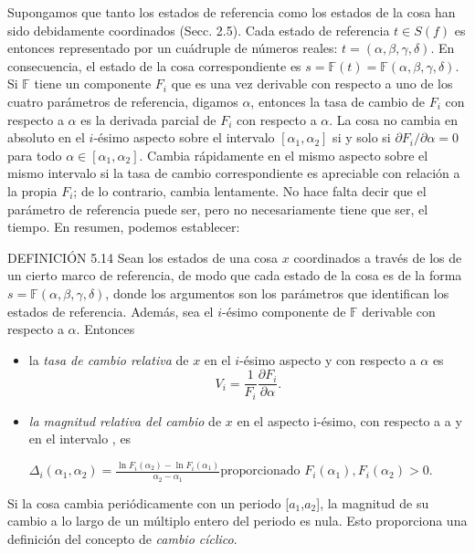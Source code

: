 \begin{justifying}
    Supongamos que tanto los estados de referencia como los estados de la cosa han sido debidamente coordinados (Secc. 2.5). Cada 
    estado de referencia $t \in S(f)$ es entonces representado por un cuádruple de números reales: $t = (\alpha, \beta, \gamma, \delta)$. 
    En consecuencia, el estado de la cosa correspondiente es $s = \mathbb{F}(t) = \mathbb{F}(\alpha, \beta, \gamma, \delta)$. Si $\mathbb{F}$ 
    tiene un componente $F_i$ que es una vez derivable con respecto a uno de los cuatro parámetros de referencia, digamos $\alpha$, entonces 
    la tasa de cambio de $F_i$ con respecto a $\alpha$ es la derivada parcial de $F_i$ con respecto a $\alpha$. La cosa no cambia en absoluto 
    en el $i$-ésimo aspecto sobre el intervalo $[\alpha_1, \alpha_2]$ si y solo si $\partial F_i/\partial \alpha = 0$ para todo $\alpha \in [\alpha_1, \alpha_2]$. 
    Cambia rápidamente en el mismo aspecto sobre el mismo intervalo si la tasa de cambio correspondiente es apreciable con relación a la 
    propia $F_i$; de lo contrario, cambia lentamente. No hace falta decir que el parámetro de referencia puede ser, pero no necesariamente 
    tiene que ser, el tiempo. En resumen, podemos establecer:

    DEFINICIÓN 5.14 Sean los estados de una cosa $x$ coordinados a través de los de un cierto marco de referencia, de modo que cada estado de la cosa es de la forma $s=\mathbb{F}(\alpha, \beta, \gamma, \delta)$, donde los argumentos son los parámetros que identifican los estados de referencia. Además, sea el $i$-ésimo componente de $\mathbb{F}$ derivable con respecto a $\alpha$. Entonces
    \begin{itemize}
        \item[(i)] la \textit{tasa de cambio relativa} de $x$ en el $i$-ésimo aspecto y con respecto a $\alpha$ es
            \[
                V_i = \frac{1}{F_i} \frac{\partial F_i}{\partial \alpha}.
            \]    
        \item[(ii)] \textit{la magnitud relativa del cambio} de $x$ en el aspecto i-ésimo, con respecto a a y en el intervalo , es
        \begin{center}
            $
                \Delta_i(\alpha_1, \alpha_2) = \frac{\ln F_i(\alpha_2) - \ln F_i(\alpha_1)}{\alpha_2 - \alpha_1}
                \text{proporcionado } F_i(\alpha_1), F_i(\alpha_2) > 0.
            $
        \end{center} 
    \end{itemize}

    Si la cosa cambia periódicamente con un periodo [$a_1$,$a_2$], la magnitud de su
    cambio a lo largo de un múltiplo entero del periodo es nula. Esto proporciona una
    definición del concepto de \textit{cambio cíclico}.


\end{justifying}
